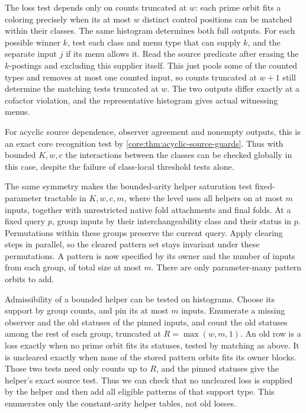 The loss test depends only on counts truncated at $w$:
each prime orbit fits a coloring precisely when its at
most $w$ distinct control positions can be matched within
their classes. The same histogram determines both full
outputs. For each possible winner $k$, test each class and
menu type that can supply $k$, and the separate input $j$
if its menu allows it. Read the source predicate after
erasing the $k$-postings and excluding this supplier itself.
This just pools some of the counted types and removes at
most one counted input, so counts truncated at $w+1$ still
determine the matching tests truncated at $w$. The two
outputs differ exactly at a cofactor violation, and the
representative histogram gives actual witnessing menus.

For acyclic source dependence, observer agreement and nonempty
outputs, this is an exact core recognition test by
\cref{core:thm:acyclic-source-guards}.
Thus with bounded $K,w,c$ the interactions between the
classes can be checked globally in this case, despite the
failure of class-local threshold tests alone.

The same symmetry makes the bounded-arity helper saturation
test fixed-parameter tractable in $K,w,c,m$, where the level
uses all helpers on at most $m$ inputs, together with
unrestricted native fold attachments and final folds.
At a fixed query $p$, group inputs by their interchangeability
class and their status in $p$. Permutations within these
groups preserve the current query. Apply clearing steps in
parallel, so the cleared pattern set stays invariant under
these permutations. A pattern is now specified by its owner
and the number of inputs from each group, of total size at
most $m$. There are only parameter-many pattern orbits to add.

Admissibility of a bounded helper can be tested on histograms.
Choose its support by group counts, and pin its at most $m$
inputs. Enumerate a missing observer and the old statuses of
the pinned inputs, and count the old statuses among the rest
of each group, truncated at $R=\max(w,m,1)$. An old row is a
loss exactly when no prime orbit fits its statuses, tested by
matching as above. It is uncleared exactly when none of the
stored pattern orbits fits its owner blocks. Those two tests
need only counts up to $R$, and the pinned statuses give the
helper's exact source test. Thus we can check that no uncleared
loss is supplied by the helper and then add all eligible
patterns of that support type. This enumerates only the
constant-arity helper tables, not old losses.

